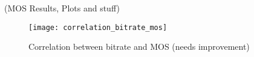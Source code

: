 (MOS Results, Plots and stuff)

\begin{figure}[h]
	\centering
	\texttt{[image: correlation\_bitrate\_mos]}
	\caption{Correlation between bitrate and MOS (needs improvement)}
	\label{fig:result:correlation_bitrate_mos}
\end{figure}
